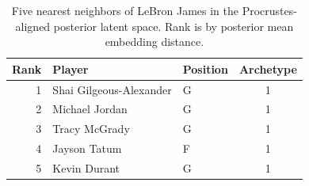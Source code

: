 \begin{table}[htbp]
  \centering\small
  \begin{tabular}{rllc}
    \toprule
    Rank & Player & Position & Archetype \\
    \midrule
    1 & Shai Gilgeous-Alexander & G & 1 \\
    2 & Michael Jordan & G & 1 \\
    3 & Tracy McGrady & G & 1 \\
    4 & Jayson Tatum & F & 1 \\
    5 & Kevin Durant & G & 1 \\
    \bottomrule
  \end{tabular}
  \caption{Five nearest neighbors of LeBron James in the Procrustes-aligned posterior latent space. Rank is by posterior mean embedding distance.}
  \label{tab:LeBron_James_neighbors}
\end{table}


